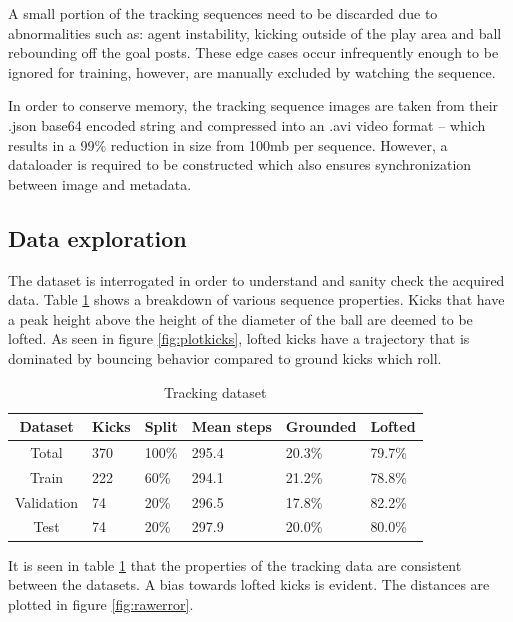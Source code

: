 \documentclass[a4paper,twoside,12pt]{report}
\begin{document}
A small portion of the tracking sequences need to be discarded due to abnormalities such as: agent instability, kicking outside of the play area and ball rebounding off the goal posts. These edge cases occur infrequently enough to be ignored for training, however, are manually excluded by watching the sequence. 

In order to conserve memory, the tracking sequence images are taken from their .json base64 encoded string and compressed into an .avi video format -- which results in a 99\% reduction in size from 100mb per sequence. However, a dataloader is required to be constructed which also ensures synchronization between image and metadata.

\subsection{Data exploration}

The dataset is interrogated in order to understand and sanity check the acquired data. Table \ref{tab:tracking} shows a breakdown of various sequence properties. Kicks that have a peak height above the height of the diameter of the ball are deemed to be lofted. As seen in figure \ref{fig:plotkicks}, lofted kicks have a trajectory that is dominated by bouncing behavior compared to ground kicks which roll. 

\begin{table}[h!]
\fontsize{9.5pt}{12pt}\selectfont
\centering
\begin{tabular}{c|ll|l|ll}
{\bf Dataset}	&{\bf Kicks}	&{\bf Split}	&{\bf Mean steps}	&{\bf Grounded}	&{\bf Lofted}	\\\hline
Total			&370			&100\%			&295.4			&20.3\%			&79.7\%			\\\hline   
Train			&222			&60\%			&294.1			&21.2\%			&78.8\%			\\\hline  
Validation		&74				&20\%			&296.5			&17.8\%			&82.2\%			\\\hline  
Test			&74				&20\%			&297.9			&20.0\%			&80.0\%			\\\hline                        
\end{tabular}
\caption{Tracking dataset}
\label{tab:tracking}
\end{table}

It is seen in table \ref{tab:tracking} that the properties of the tracking data are consistent between the datasets. A bias towards lofted kicks is evident. The distances are plotted in figure \ref{fig:rawerror}.
\end{document}
